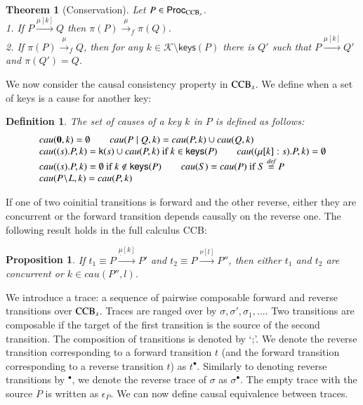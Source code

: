 \documentclass[preprint,12pt]{elsarticle}
\newcommand{\paral}{\; \vert \;}
\newcommand{\Proc}{\mathsf{Proc}}
\newcommand{\restrict}[1]{\!\setminus\!#1}
\newcommand{\Nil}{\mathbf{0}}
\newcommand{\keys}[1]{\mathsf{keys}(#1)}
\newcommand{\kkey}[1]{\mathsf{k}(#1)}
\newcommand{\Keys}{\mathcal{K}}
\newcommand{\bydef}{\stackrel{\emph{def}}{=}}
\newtheorem{theorem}{Theorem}
\newtheorem{definition}{Definition}
\newtheorem{proposition}{Proposition}
\begin{document}
\begin{theorem}[Conservation]\label{prop:strip}
	Let $P \in \Proc_{{\rm CCB}_s}$.\\
1.  If $P \xrightarrow{\mu[k]} Q$ then $\pi(P) \xrightarrow{\mu}_f \pi(Q)$.\\
2.  If $\pi(P) \xrightarrow{\mu}_f Q$, then for any $k \in \Keys \restrict \keys{P}$ there is $Q'$ such that $P \xrightarrow{\mu[k]} Q'$ and $\pi(Q')=Q$.
\end{theorem}
We now consider the causal consistency property \cite{DK04} in ${\rm CCB}_s$. We define when
a set of keys is a cause for another key:
\renewcommand{\arraystretch}{1}
\begin{definition}\label{def:causalkeys} \normalfont The set of causes of a key $k$ in $P$ 
	is defined as follows:
$$\begin{array}{l}
cau(\Nil,k)=\emptyset \qquad  cau(P \paral Q,k)=cau(P,k) \cup cau(Q,k) \\ %
cau((s).P,k)=\kkey{s} \cup cau(P,k) \mbox{ if }k\in \keys{P} \qquad  cau((\mu[k]:s).P,k)=\emptyset \\ %
cau((s).P,k)=\emptyset \mbox{ if }k\notin \keys{P} \qquad  cau(S) = cau(P) \mbox{ if }S \bydef P \\ %
cau(P \restrict L,k)=cau(P,k) 
\end{array}$$
\end{definition}
If one of two coinitial transitions is forward and the other reverse, either they are concurrent or
the forward transition depends causally on the reverse one. The following result holds in the full
calculus CCB: 

\begin{proposition}\label{prop:conflict} \normalfont If $t_1 \equiv P \xrightarrow{\underline{\mu}[k]} P'$ and $t_2 \equiv P \xrightarrow{\nu[l]} P''$, then either $t_1$ and $t_2$ are concurrent or $k \in cau(P'',l)$.
\end{proposition}
%
We introduce a trace: a sequence of pairwise composable forward and reverse transitions 
over ${\rm CCB}_s$. Traces are ranged over by $\sigma, \sigma', \sigma_1, \ldots$.
Two transitions are composable if the target of the first transition is the source of the second 
transition. The composition of transitions is denoted by `;'.  We denote the reverse transition corresponding 
to a forward transition $t$ (and the forward transition corresponding to a reverse transition $t$)
as $t^\bullet$. Similarly to denoting reverse transitions by $^\bullet$, we denote the reverse trace of 
$\sigma$ as $\sigma^\bullet$.
The empty trace with the source $P$ is written as $\epsilon_P$. We can now define causal equivalence 
between traces. 
\end{document}
